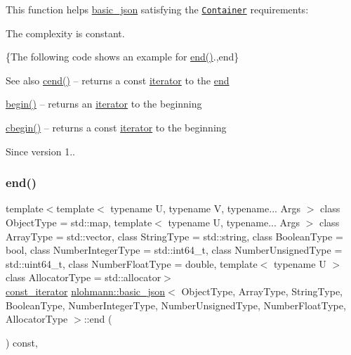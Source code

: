 This function helps {\ttfamily \hyperlink{classnlohmann_1_1basic__json}{basic\+\_\+json}} satisfying the \href{http://en.cppreference.com/w/cpp/concept/Container}{\tt Container} requirements\+:
\begin{DoxyItemize}
\item The complexity is constant.
\end{DoxyItemize}

\{The following code shows an example for {\ttfamily \hyperlink{classnlohmann_1_1basic__json_a12ccf14d39ddae52f6c7e126105a230b}{end()}}.,end\}

\begin{DoxySeeAlso}{See also}
\hyperlink{classnlohmann_1_1basic__json_aa730d68d55ccc48d2cd4835ff46d2a0f}{cend()} -- returns a const \hyperlink{classnlohmann_1_1basic__json_1_1iterator}{iterator} to the \hyperlink{classnlohmann_1_1basic__json_a12ccf14d39ddae52f6c7e126105a230b}{end} 

\hyperlink{classnlohmann_1_1basic__json_ad4e381c54039607be08d7af41a1f6ad1}{begin()} -- returns an \hyperlink{classnlohmann_1_1basic__json_1_1iterator}{iterator} to the beginning 

\hyperlink{classnlohmann_1_1basic__json_a7355a41b0033ff8a27d58550544d5a59}{cbegin()} -- returns a const \hyperlink{classnlohmann_1_1basic__json_1_1iterator}{iterator} to the beginning
\end{DoxySeeAlso}
\begin{DoxySince}{Since}
version 1.. 
\end{DoxySince}
\hypertarget{classnlohmann_1_1basic__json_abd7e95159740e94160c13392b1536eb1}{}\label{classnlohmann_1_1basic__json_abd7e95159740e94160c13392b1536eb1} 
\subsubsection{\texorpdfstring{end()}{end()}\hspace{0.1cm}{\footnotesize\ttfamily [2/2]}}
{\footnotesize\ttfamily template$<$template$<$ typename U, typename V, typename... Args $>$ class Object\+Type = std\+::map, template$<$ typename U, typename... Args $>$ class Array\+Type = std\+::vector, class String\+Type  = std\+::string, class Boolean\+Type  = bool, class Number\+Integer\+Type  = std\+::int64\+\_\+t, class Number\+Unsigned\+Type  = std\+::uint64\+\_\+t, class Number\+Float\+Type  = double, template$<$ typename U $>$ class Allocator\+Type = std\+::allocator$>$ \\
\hyperlink{classnlohmann_1_1basic__json_1_1const__iterator}{const\+\_\+iterator} \hyperlink{classnlohmann_1_1basic__json}{nlohmann\+::basic\+\_\+json}$<$ Object\+Type, Array\+Type, String\+Type, Boolean\+Type, Number\+Integer\+Type, Number\+Unsigned\+Type, Number\+Float\+Type, Allocator\+Type $>$\+::end (\begin{DoxyParamCaption}{ }\end{DoxyParamCaption}) const\hspace{0.3cm}{\ttfamily [inline]}, {\ttfamily [noexcept]}}



